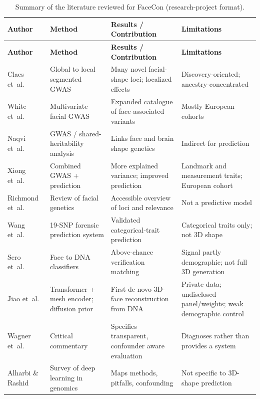 {\small\setlength{\LTpre}{6pt}\setlength{\LTpost}{0pt}
\begin{longtable}{|P{2.6cm}|P{3.5cm}|P{4.0cm}|P{3.2cm}|}
\caption{Summary of the literature reviewed for FaceCon (research-project format).}\label{tab:litsummary}\\
\hline
\textbf{Author} & \textbf{Method} & \textbf{Results / Contribution} & \textbf{Limitations} \\ \hline
\endfirsthead
\hline
\textbf{Author} & \textbf{Method} & \textbf{Results / Contribution} & \textbf{Limitations} \\ \hline
\endhead
\hline
\endfoot
Claes et~al.~\cite{ref:claes} & Global to local segmented GWAS & Many novel facial-shape loci; localized effects & Discovery-oriented; ancestry-concentrated \\ \hline
White et~al.~\cite{ref:white} & Multivariate facial GWAS & Expanded catalogue of face-associated variants & Mostly European cohorts \\ \hline
Naqvi et~al.~\cite{ref:naqvi} & GWAS / shared-heritability analysis & Links face and brain shape genetics & Indirect for prediction \\ \hline
Xiong et~al.~\cite{ref:xiong} & Combined GWAS + prediction & More explained variance; improved prediction & Landmark and measurement traits; European cohort \\ \hline
Richmond et~al.~\cite{ref:richmond} & Review of facial genetics & Accessible overview of loci and relevance & Not a predictive model \\ \hline
Wang et~al.~\cite{ref:wang} & 19-SNP forensic prediction system & Validated categorical-trait prediction & Categorical traits only; not 3D shape \\ \hline
Sero et~al.~\cite{ref:sero} & Face to DNA classifiers & Above-chance verification matching & Signal partly demographic; not full 3D generation \\ \hline
Jiao et~al.~\cite{ref:difface} & Transformer + mesh encoder; diffusion prior & First de novo 3D-face reconstruction from DNA & Private data; undisclosed panel/weights; weak demographic control \\ \hline
Wagner et~al.~\cite{ref:comment} & Critical commentary & Specifies transparent, confounder aware evaluation & Diagnoses rather than provides a system \\ \hline
Alharbi \& Rashid~\cite{ref:alharbi} & Survey of deep learning in genomics & Maps methods, pitfalls, confounding & Not specific to 3D-shape prediction \\ \hline

\end{longtable}}
